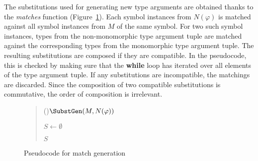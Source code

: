 \documentclass[]{ceurart}
\begin{document}
The substitutions used for generating new type arguments are obtained thanks to the \emph{matches} function (Figure~\ref{subst_gen}).
Each symbol instances from \(N(\varphi)\) is matched against all symbol instances from \(M\) of the same symbol.
For two such symbol instances, types from the non-monomorphic type argument tuple are matched against the corresponding types from the monomorphic type argument tuple. The resulting substitutions are composed if they are compatible. In the pseudocode, this is checked by making sure that the \textbf{while} loop has iterated over all elements of the type argument tuple. If any substitutions are incompatible, the matchings are discarded. Since the composition of two compatible substitutions is commutative, the order of composition is irrelevant.

\begin{figure}
\begin{quote}
\begin{algorithm}[H]
\Fn(){\(\SubstGen(M, N(\varphi))\)}{

   \BlankLine

   \(S\leftarrow \emptyset\)\;

   \BlankLine


   \BlankLine

   \Return \(S\)\;

}
\end{algorithm}
\end{quote}
\caption{Pseudocode for match generation}
\label{subst_gen}
\end{figure}
\end{document}
